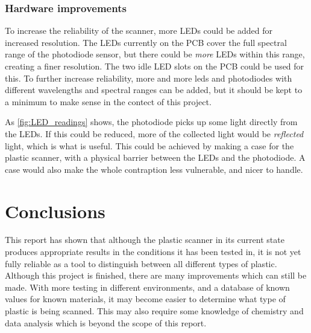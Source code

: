 \documentclass[12pt, a4paper]{article}
\begin{document}
            \subsubsection{Hardware improvements}
            To increase the reliability of the scanner, more LEDs could be added for increased resolution. The LEDs currently on the PCB
            cover the full spectral range of the photodiode sensor, but there could be \textit{more} LEDs within this range, creating a finer
            resolution. The two idle LED slots on the PCB could be used for this. To further increase reliability, more and more leds and
            photodiodes with different wavelengths and spectral ranges can be added, but it should be kept to a minimum to make sense in the
            contect of this project.\par
            As \cref{fig:LED_readings} shows, the photodiode picks up some light directly from the LEDs. If this could be reduced, more of the
            collected light would be \textit{reflected} light, which is what is useful. This could be achieved by making a case for the plastic
            scanner, with a physical barrier between the LEDs and the photodiode. A case would also make the whole contraption less vulnerable,
            and nicer to handle.

    \section{Conclusions}

            This report has shown that although the plastic scanner in its current state produces appropriate results in the conditions
            it has been tested in, it is not yet fully reliable as a tool to distinguish between all different types of plastic. Although this project
            is finished, there are many improvements which can still be made. With more testing in different environments, and a database of known values for known materials,
            it may become easier to determine what type of plastic is being scanned. This may also require some knowledge of chemistry and data analysis
            which is beyond the scope of this
            report.

    \clearpage
    
    
\end{document}
